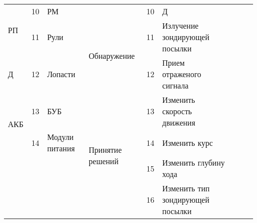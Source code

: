 \begin{landscape}
\begin{longtable}[c]{llm{}||l|l|m{}||llm{}}
\multicolumn{1}{|l|}{\multirow{2}{*}{РП}}  & \multicolumn{1}{l|}{10}         & РМ                                          &                                   & 10                              & Д                                &                                           &                                 &                                                           \\ \cline{2-6}
\multicolumn{1}{|l|}{}                     & \multicolumn{1}{l|}{11}         & Рули                                        & \multirow{2}{*}{Обнаружение}      & 11                              & Излучение зондирующей посылки    &                                           &                                 &                                                           \\ \cline{1-3} \cline{5-6}
\multicolumn{1}{|l|}{Д}                    & \multicolumn{1}{l|}{12}         & Лопасти                                     &                                   & 12                              & Прием отраженого сигнала         &                                           &                                 &                                                           \\ \cline{1-6}
\multicolumn{1}{|l|}{\multirow{2}{*}{АКБ}} & \multicolumn{1}{l|}{13}         & БУБ                                         & \multirow{4}{*}{Принятие решений} & 13                              & Изменить скорость движения       &                                           &                                 &                                                           \\ \cline{2-3} \cline{5-6}
\multicolumn{1}{|l|}{}                     & \multicolumn{1}{l|}{14}         & Модули питания                              &                                   & 14                              & Изменить курс                    &                                           &                                 &                                                           \\ \cline{1-3} \cline{5-6}
                                           &                                 &                                             &                                   & 15                              & Изменить глубину хода            &                                           &                                 &                                                           \\ \cline{5-6}
                                           &                                 &                                             &                                   & 16                              & Изменить тип зондирующей посылки &                                           &                                 &                                                           \\ \cline{4-6}
\end{longtable}
\end{landscape}